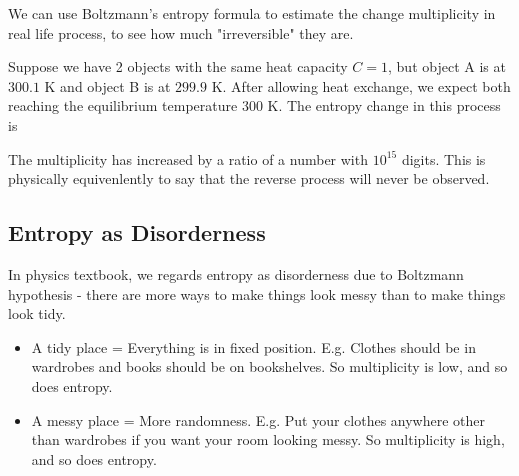 \documentclass[class=article, crop=false, 12pt]{standalone}
\begin{document}
\newpage
\begin{example}
    We can use Boltzmann's entropy formula to estimate the change multiplicity in real life process,
    to see how much "irreversible" they are.

    Suppose we have 2 objects with the same heat capacity $C=1$,
    but object A is at $300.1$ K and object B is at $299.9$ K.
    After allowing heat exchange,
    we expect both reaching the equilibrium temperature $300$ K.
    The entropy change in this process is 

    The multiplicity has increased by a ratio of a number with $10^{15}$ digits.
    This is physically equivenlently to say that the reverse process will never be observed.
\end{example}

\subsection{Entropy as Disorderness}

In physics textbook, 
we regards entropy as disorderness due to Boltzmann hypothesis - 
there are more ways to make things look messy than to make things look tidy.
\begin{itemize}
    \item A tidy place = Everything is in fixed position. E.g. Clothes should be in wardrobes and books should be on bookshelves.
    So multiplicity is low, and so does entropy.

    \item A messy place = More randomness. E.g. Put your clothes anywhere other than wardrobes if you want your room looking messy.
    So multiplicity is high, and so does entropy.
\end{itemize}
\end{document}
